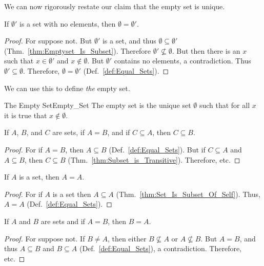         We can now rigorously restate our claim that the empty set is unique.
        \begin{theorem}
            If $\emptyset'$ is a set with no elements,
            then $\emptyset=\emptyset'$.
        \end{theorem}
        \begin{proof}
            For suppose not. But $\emptyset'$ is a set, and thus
            $\emptyset\subseteq\emptyset'$ (Thm.~\ref{thm:Emptyset_Is_Subset}).
            Therefore $\emptyset'\nsubseteq\emptyset$. But then there is an $x$
            such that $x\in\emptyset'$ and $x\notin\emptyset$. But $\emptyset'$
            contains no elements, a contradiction. Thus
            $\emptyset'\subseteq\emptyset$. Therefore,
            $\emptyset=\emptyset'$ (Def.~\ref{def:Equal_Sets}).
        \end{proof}
        We can use this to define \textit{the} empty set.
        \begin{fdefinition}{The Empty Set}{Empty_Set}
            The empty set is the unique set $\emptyset$ such that for all $x$
            it is true that $x\notin\emptyset$.
        \end{fdefinition}
        \begin{theorem}
            \label{thm:Subsets_of_Equal_Sets}%
            If $A$, $B$, and $C$ are sets, if $A=B$, and if $C\subseteq{A}$,
            then $C\subseteq{B}$.
        \end{theorem}
        \begin{proof}
            For if $A=B$, then $A\subseteq{B}$ (Def.~\ref{def:Equal_Sets}). But
            if $C\subseteq{A}$ and $A\subseteq{B}$, then $C\subseteq{B}$
            (Thm.~\ref{thm:Subset_is_Transitive}). Therefore, etc.
        \end{proof}
        \begin{theorem}
            \label{thm:Equality_Reflexive}%
            If $A$ is a set, then $A=A$.
        \end{theorem}
        \begin{proof}
            For if $A$ is a set then $A\subseteq{A}$
            (Thm.~\ref{thm:Set_Is_Subset_Of_Self}). Thus,
            $A=A$ (Def.~\ref{def:Equal_Sets}).
        \end{proof}
        \begin{theorem}
            \label{thm:Equality_Symmetric}%
            If $A$ and $B$ are sets and if $A=B$, then $B=A$.
        \end{theorem}
        \begin{proof}
            For suppose not. If $B\ne{A}$, then either $B\nsubseteq{A}$ or
            $A\nsubseteq{B}$. But $A=B$, and thus $A\subseteq{B}$  and
            $B\subseteq{A}$ (Def.~\ref{def:Equal_Sets}),
            a contradiction. Therefore, etc.
        \end{proof}
